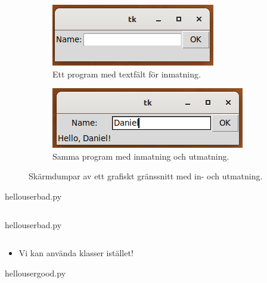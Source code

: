 \begin{frame}
  \begin{figure}
    \begin{subfigure}{\columnwidth}
      \centering
      \includegraphics[height=0.3\textheight]{figs/hello_user.png}
      \caption{Ett program med textfält för inmatning.}
    \end{subfigure}
    \begin{subfigure}{\columnwidth}
      \centering
      \includegraphics[height=0.3\textheight]{figs/hello_user_daniel.png}
      \caption{Samma program med inmatning och utmatning.}
    \end{subfigure}
    \caption{Skärmdumpar av ett grafiskt gränssnitt med in- och utmatning.}
  \end{figure}
\end{frame}

\begin{frame}[fragile]
  hello\textunderscore user\textunderscore bad.py \hrulefill
  \inputminted[linenos,firstline=7,lastline=19]{python}{examples/hello_user_bad.py}
\end{frame}

\begin{frame}[fragile]
  hello\textunderscore user\textunderscore bad.py \hrulefill
  \inputminted[linenos,firstline=21,lastline=31]{python}{examples/hello_user_bad.py}
\end{frame}

\begin{frame}
  \begin{remark}
    \begin{itemize}
      \item Vi kan använda klasser istället!
    \end{itemize}
  \end{remark}
\end{frame}

\begin{frame}[fragile]
  hello\textunderscore user\textunderscore good.py \hrulefill
  \inputminted[linenos,lastline=12]{python}{examples/hello_user_good.py}
\end{frame}

